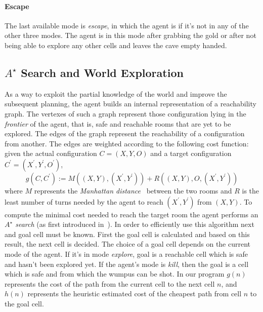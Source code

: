 \documentclass{llncs}
\begin{document}
\paragraph{Escape} The last available mode is \emph{escape}, in which the agent is if it's not in any of the other three modes. The agent is in this mode after grabbing the gold or after not being able to explore any other cells and leaves the cave empty handed.

\subsection{$A^{\star}$ Search and World Exploration}

As a way to exploit the partial knowledge of the world and improve the subsequent planning, the agent builds an internal representation of a reachability graph.
The vertexes of such a graph represent those configuration lying in the \emph{frontier} of the agent, that is, safe and reachable rooms that are yet to be explored.
The edges of the graph represent the reachability of a configuration from another.
The edges are weighted according to the following cost function: given the actual configuration $C = (X,Y,O)$ and a target configuration $C^\prime = (X^\prime,Y^\prime,O^\prime)$,
$$
	g(C,C^\prime) := M((X,Y),(X^\prime,Y^\prime)) + R((X,Y),O,(X^\prime,Y^\prime))
$$
where $M$ represents the \emph{Manhattan distance}~\cite{Manhattan} between the two rooms and $R$ is the least number of turns needed by the agent to reach $(X^\prime,Y^\prime)$ from $(X,Y)$.
To compute the minimal cost needed to reach the target room the agent performs an \emph{$A^{\star}$ search} (as first introduced in~\cite{AStar}).%
In order to efficiently use this algorithm next and goal cell must be known. 
First the goal cell is calculated and based on this result, the next cell is decided.  The choice of a goal cell depends on the current mode of the agent. If it's in mode \emph{explore}, goal is a reachable cell which is safe and hasn't been explored yet. If the agent's mode is \emph{kill}, then the goal is a cell which is safe and from which the wumpus can be shot.
In our program \(g(n)\) represents the cost of the path from the current cell to the next cell \(n\), and \(h(n)\) represents the heuristic estimated cost of the cheapest path from cell \(n\) to the goal cell. 
\end{document}
